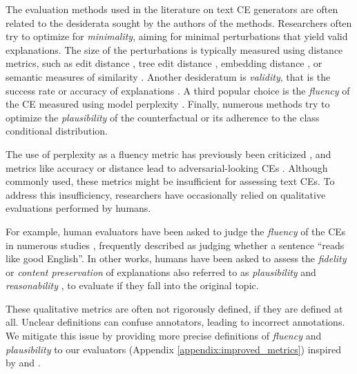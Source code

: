 \documentclass[11pt]{article}
\begin{document}
The evaluation methods used in the literature on text CE generators are often related to the desiderata sought by the authors of the methods. Researchers often try to optimize for \textit{minimality}, aiming for minimal perturbations that yield valid explanations. The size of the perturbations is typically measured using distance metrics, such as edit distance \cite{gilo_general_2024, wu_polyjuice_2021, ross_explaining_2021, betti_relevance-based_2023, dixit_core_2022}, tree edit distance \cite{gilo_general_2024, wu_polyjuice_2021, madaan_generate_2021}, embedding distance \cite{betti_relevance-based_2023}, or semantic measures of similarity \cite{robeer_generating_2021}. Another desideratum is \textit{validity}, that is the success rate or accuracy of explanations \cite{wu_polyjuice_2021, madaan_generate_2021, ross_explaining_2021, betti_relevance-based_2023, robeer_generating_2021}. A third popular choice is the \textit{fluency} of the CE measured using model perplexity \cite{dathathri_plug_2019, madaan_counterfactual_2023, treviso_crest_2023, fern_text_2021}. Finally, numerous methods try to optimize the \textit{plausibility} of the counterfactual \cite{gilo_general_2024, madaan_generate_2021, yang_generating_2020} or its adherence to the class conditional distribution.

The use of perplexity as a fluency metric has previously been criticized \cite{meister_language_2021}, and metrics like accuracy or distance lead to adversarial-looking CEs \cite{altmeyer_endogenous_2023}. Although commonly used, these metrics might be insufficient for assessing text CEs. To address this insufficiency, researchers have occasionally relied on qualitative evaluations performed by humans. 

For example, human evaluators have been asked to judge the \textit{fluency} of the CEs in numerous studies \cite{dathathri_plug_2019, wu_polyjuice_2021, madaan_generate_2021, ross_explaining_2021, betti_relevance-based_2023}, frequently described as judging whether a sentence ``reads like good English''. In other works, humans have been asked to assess the \textit{fidelity} or \textit{content preservation} of explanations \cite{madaan_generate_2021, betti_relevance-based_2023, wu_mask_2019} also referred to as \textit{plausibility} and \textit{reasonability} \cite{yang_generating_2020}, to evaluate if they fall into the original topic. 

These qualitative metrics are often not rigorously defined, if they are defined at all. Unclear definitions can confuse annotators, leading to incorrect annotations. We mitigate this issue by providing more precise definitions of \textit{fluency} and \textit{plausibility} to our evaluators (Appendix \ref{appendix:improved_metrics}) inspired by \citet{ma_corpus_2006} and \citet{altmeyer_faithful_2024}.
\end{document}

